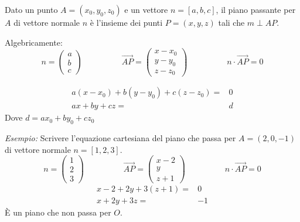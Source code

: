 \documentclass[../main.tex]{subfiles}
\begin{document}
Dato un punto $A=(x_0,y_0,z_0)$ e un vettore $n=[a,b,c]$, il piano passante per $A$ di vettore normale $n$ è l'insieme dei punti $P=(x,y,z)$
tali che $m\perp AP$.

Algebricamente:
$$
    n = \begin{pmatrix}
        a \\ b \\ c
    \end{pmatrix}
    \phantom{-----}
    \vec{AP} = \begin{pmatrix}
        x-x_0 \\
        y-y_0 \\
        z-z_0
    \end{pmatrix}
    \phantom{-----}
    n \cdot \vec{AP} = 0
$$

\begin{align*}
    a(x-x_0) + b(y-y_0) + c(z-z_0) =& 0 \\
    ax + by + cz =& d
\end{align*}
Dove $d = ax_0 + by_0 + cz_0$

\textit{Esempio:} Scrivere l'equazione cartesiana del piano che passa per $A=(2,0,-1)$ di vettore normale $n=[1,2,3]$.
$$
    n = \begin{pmatrix}
        1 \\ 2 \\ 3
    \end{pmatrix}
    \phantom{-----}
    \vec{AP} = \begin{pmatrix}
        x-2 \\
        y \\
        z+1
    \end{pmatrix}
    \phantom{-----}
    n \cdot \vec{AP} = 0
$$
\begin{align*}
    x -2 + 2y + 3(z+1) =& 0 \\
    x + 2y + 3z =& -1
\end{align*}
È un piano che non passa per $O$.
\end{document}
